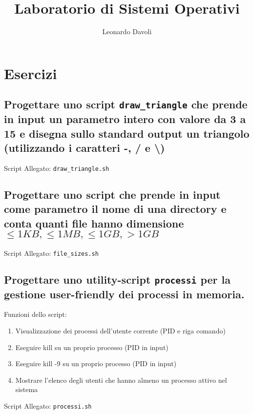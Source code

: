 \documentclass{article}
\author{Leonardo Davoli}
\title{Laboratorio di Sistemi Operativi}
\begin{document}
\maketitle

\setcounter{section}{3} %
\section{Esercizi}

\subsection{Progettare uno script \texttt{draw\_triangle} che prende in input un parametro intero con valore da 3 a 15 
e disegna sullo standard output un triangolo (utilizzando i caratteri -, / e \textbackslash)}

Script Allegato: \texttt{draw\_triangle.sh}

\subsection{Progettare uno script che prende in input come parametro il nome di una directory e conta quanti file hanno dimensione 
$\leq 1KB, \leq 1MB, \leq 1GB, > 1GB$}

Script Allegato: \texttt{file\_sizes.sh}

\subsection{Progettare uno utility-script \texttt{processi} per la gestione user-friendly dei processi in memoria.}

Funzioni dello script:
\begin{enumerate}
    \item Visualizzazione dei processi dell'utente corrente (PID e riga comando)
    \item Eseguire kill su un proprio processo (PID in input)
    \item Eseguire kill -9 su un proprio processo (PID in input)
    \item Mostrare l'elenco degli utenti che hanno almeno un processo attivo nel sistema
\end{enumerate}

Script Allegato: \texttt{processi.sh}
\end{document}
